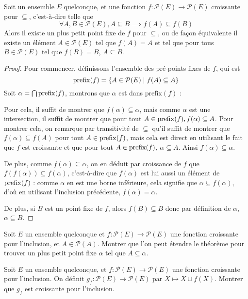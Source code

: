 \begin{theorem}\label{thm.ind.KT}
  Soit un ensemble $E$ quelconque, et une fonction
  $f : \mathcal P(E) \to \mathcal P(E)$ croissante pour $\subseteq$,
  c'est-à-dire telle que
  \[\forall A,B\in\mathcal P(E), A\subseteq B \implies f(A)\subseteq f(B)\]
  Alors il existe un plus petit point fixe de $f$ pour $\subseteq$, ou de façon
  équivalente il existe un élément $A\in \mathcal P(E)$ tel que $f(A)=A$ et tel
  que pour tous $B\in\mathcal P(E)$ tel que $f(B)=B$, $A\subseteq B$.
\end{theorem}
\begin{proof}
  Pour commencer, définissons l'ensemble des pré-points fixes de $f$, qui est
  \[\operatorname{prefix}(f) = \{ A \in \mathcal P(E)\mid f(A)\subseteq A\}\]
  Soit $\alpha = \bigcap \operatorname{prefix}(f)$, montrons que $\alpha$ est dans
  $\mathrm{prefix}(f)$ :

  Pour cela, il suffit de montrer que $f(\alpha)\subseteq \alpha$, mais comme
  $\alpha$ est une intersection, il suffit de montrer que pour tout
  $A\in\operatorname{prefix}(f), f(\alpha)\subseteq A$. Pour montrer cela, on
  remarque par transitivité de $\subseteq$ qu'il suffit de montrer que
  $f(\alpha)\subseteq f(A)$ pour tout $A\in \operatorname{prefix}(f)$, mais cela est
  direct en utilisant le fait que $f$ est croissante et que pour tout
  $A\in \operatorname{prefix}(f)$, $\alpha \subseteq A$. Ainsi
  $f(\alpha)\subseteq \alpha$.

  De plus, comme $f(\alpha)\subseteq \alpha$, on en déduit par croissance de
  $f$ que $f(f(\alpha))\subseteq f(\alpha)$, c'est-à-dire que $f(\alpha)$ est
  lui aussi un élément de $\operatorname{prefix}(f)$ : comme $\alpha$ en est une
  borne inférieure, cela signifie que $\alpha \subseteq f(\alpha)$, d'où en
  utilisant l'inclusion précédente, $f(\alpha) = \alpha$.

  De plus, si $B$ est un point fixe de $f$, alors $f(B)\subseteq B$ donc par
  définition de $\alpha$, $\alpha \subseteq B$.
\end{proof}

\begin{exercise}
  Soit $E$ un ensemble quelconque et $f : \mathcal P(E) \to \mathcal P(E)$ une
  fonction croissante pour l'inclusion, et $A \in \mathcal P(A)$. Montrer que
  l'on peut étendre le théorème pour trouver un plus petit point fixe $\alpha$
  tel que $A\subseteq \alpha$.
\end{exercise}

\begin{exercise}
  Soit $E$ un ensemble quelconque, et $f : \mathcal P(E) \to \mathcal P(E)$ une
  fonction croissante pour l'inclusion. On définit
  $g_f : \mathcal P(E) \to \mathcal P(E)$ par $X \mapsto X \cup f(X)$. Montrer
  que $g_f$ est croissante pour l'inclusion.
\end{exercise}

